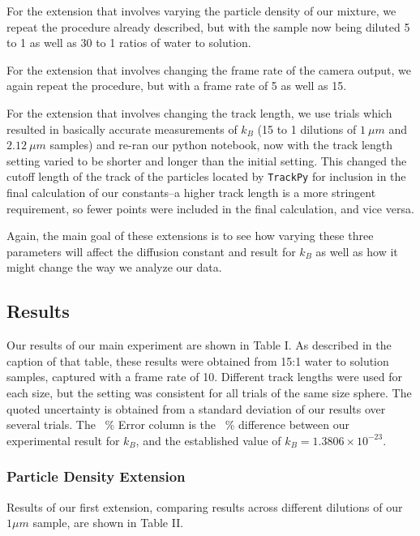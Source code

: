 \documentclass[twocolumn,amsmath,amssymb,pra, floatfix]{revtex4-2}
\begin{document}
For the extension that involves varying the particle density of our mixture, we repeat the procedure already described, but with the sample now being diluted 5 to 1 as well as 30 to 1 ratios of water to solution. 

For the extension that involves changing the frame rate of the camera output, we again repeat the procedure, but with a frame rate of 5 as well as 15.

For the extension that involves changing the track length, we use trials which resulted in basically accurate measurements of $k_B$ (15 to 1 dilutions of $1 \ \si{\mu m}$ and $2.12 \ \si{\mu m}$ samples) and re-ran our python notebook, now with the track length setting varied to be shorter and longer than the initial setting. This changed the cutoff length of the track of the particles located by \texttt{TrackPy} for inclusion in the final calculation of our constants--a higher track length is a more stringent requirement, so fewer points were included in the final calculation, and vice versa. 

Again, the main goal of these extensions is to see how varying these three parameters will affect the diffusion constant and result for $k_B$ as well as how it might change the way we analyze our data.


\subsection{Results}
Our results of our main experiment are shown in Table I. As described in the caption of that table, these results were obtained from 15:1 water to solution samples, captured with a frame rate of 10. Different track lengths were used for each size, but the setting was consistent for all trials of the same size sphere. The quoted uncertainty is obtained from a standard deviation of our results over several trials. The \SI{}{\percent} Error column is the \SI{}{\percent} difference between our experimental result for $k_B$, and the established value of $k_B = 1.3806\times10^{-23}$.



\subsubsection{Particle Density Extension}
Results of our first extension, comparing results across different dilutions of our $1 \si{\mu m}$ sample, are shown in Table II. 
\end{document}

